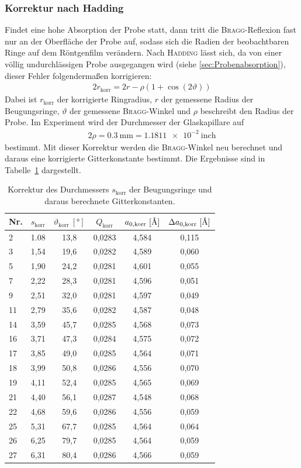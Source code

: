 \documentclass[a4paper,twoside,final]{article}
\begin{document}
\subsubsection{Korrektur nach Hadding}
Findet eine hohe Absorption der Probe statt, dann tritt die \textsc{Bragg}-Reflexion fast nur an der Oberfläche der Probe auf, sodass sich die Radien der beobachtbaren Ringe auf dem Röntgenfilm verändern. Nach \textsc{Hadding} lässt sich, da von einer völlig undurchlässigen Probe ausgegangen wird (siehe \ref{sec:Probenabsorption}), dieser Fehler folgendermaßen korrigieren:
\begin{align}
  2r_\text{korr} = 2r - \rho (1+\cos(2\vartheta))
\end{align}
Dabei ist $r_\text{korr}$ der korrigierte Ringradius, $r$ der gemessene Radius der Beugungsringe, $\vartheta$ der gemessene \textsc{Bragg}-Winkel und $\rho$ beschreibt den Radius der Probe. Im Experiment wird der Durchmesser der Glaskapillare auf
\begin{align}
  2\rho = \SI{0,3}{\milli\metre} = \SI{1,1811e-2}{\text{inch}}
\end{align}
bestimmt. Mit dieser Korrektur werden die \textsc{Bragg}-Winkel neu berechnet und daraus eine korrigierte Gitterkonstante bestimmt. Die Ergebnisse sind in Tabelle~\ref{tab:Hadding} dargestellt.
\begin{table}[ht]
	\centering
	\caption{Korrektur des Durchmessers $s_\text{korr}$ der Beugungsringe und daraus berechnete Gitterkonstanten.}
	\label{tab:Hadding}
	\begin{tabular}{l c c c c c}
		\toprule
      Nr. & $s_\text{korr}$ & $\vartheta_\text{korr}~[\si{\degree}]$ & $Q_\text{korr}$ & $a_{0,\text{korr}}~[\si{\textup{\AA}}]$ & $\Delta a_{0,\text{korr}}~[\si{\textup{\AA}}]$\\
    \midrule
    2  & 1.08 & 13,8 & 0,0283 & 4,584 & 0,115 \\
    3  & 1,54 & 19,6 & 0,0282 & 4,589 & 0,060 \\
    5  & 1,90 & 24,2 & 0,0281 & 4,601 & 0,055 \\
    7  & 2,22 & 28,3 & 0,0281 & 4,596 & 0,051 \\
    9  & 2,51 & 32,0 & 0,0281 & 4,597 & 0,049 \\
    11 & 2,79 & 35,6 & 0,0282 & 4,587 & 0,048 \\
    14 & 3,59 & 45,7 & 0,0285 & 4,568 & 0,073 \\
    16 & 3,71 & 47,3 & 0,0284 & 4,575 & 0,072 \\
    17 & 3,85 & 49,0 & 0,0285 & 4,564 & 0,071 \\
    18 & 3,99 & 50,8 & 0,0286 & 4,556 & 0,070 \\
    19 & 4,11 & 52,4 & 0,0285 & 4,565 & 0,069 \\
    21 & 4,40 & 56,1 & 0,0287 & 4,548 & 0,068 \\
    22 & 4,68 & 59,6 & 0,0286 & 4,556 & 0,059 \\
    25 & 5,31 & 67,7 & 0,0285 & 4,564 & 0,064 \\
    26 & 6,25 & 79,7 & 0,0285 & 4,564 & 0,059 \\
    27 & 6,31 & 80,4 & 0,0286 & 4,566 & 0,059
	\end{tabular}
\end{table}
\end{document}
